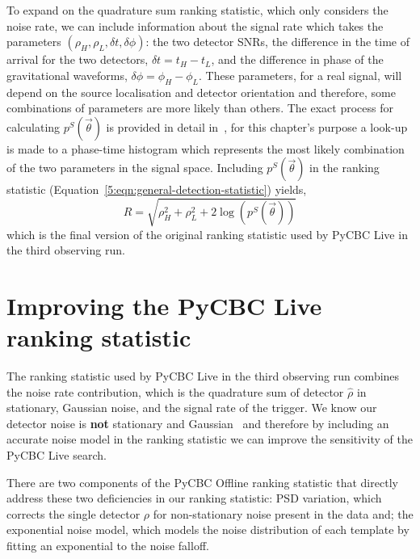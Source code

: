To expand on the quadrature sum ranking statistic, which only considers the noise rate, we can include information about the signal rate which takes the parameters $(\rho_{H}, \rho_{L}, \delta t, \delta \phi)$: the two detector SNRs, the difference in the time of arrival for the two detectors, $\delta t = t_{H} - t_{L}$, and the difference in phase of the gravitational waveforms, $\delta \phi = \phi_{H} - \phi_{L}$. These parameters, for a real signal, will depend on the source localisation and detector orientation and therefore, some combinations of parameters are more likely than others. The exact process for calculating $p^{S}(\Vec{\theta})$ is provided in detail in~\cite{PyCBC:2017}, for this chapter's purpose a look-up is made to a phase-time histogram which represents the most likely combination of the two parameters in the signal space. Including $p^{S}(\Vec{\theta})$ in the ranking statistic (Equation~\ref{5:eqn:general-detection-statistic}) yields,
%
\begin{equation}
    R = \sqrt{\rho^{2}_{H} + \rho^{2}_{L} + 2 \log\left(p^{S}(\Vec{\theta})\right)}
    \label{5:eqn:original-statistic}
\end{equation}
%
which is the final version of the original ranking statistic used by PyCBC Live in the third observing run.

\section{\label{5:sec:new-additions}Improving the PyCBC Live ranking statistic}

The ranking statistic used by PyCBC Live in the third observing run combines the noise rate contribution, which is the quadrature sum of detector $\hat{\rho}$ in stationary, Gaussian noise, and the signal rate of the trigger. We know our detector noise is \textbf{not} stationary and Gaussian~\cite{LIGO_data_quality:2015} and therefore by including an accurate noise model in the ranking statistic we can improve the sensitivity of the PyCBC Live search.

There are two components of the PyCBC Offline ranking statistic that directly address these two deficiencies in our ranking statistic: PSD variation, which corrects the single detector $\rho$ for non-stationary noise present in the data and; the exponential noise model, which models the noise distribution of each template by fitting an exponential to the noise falloff.

